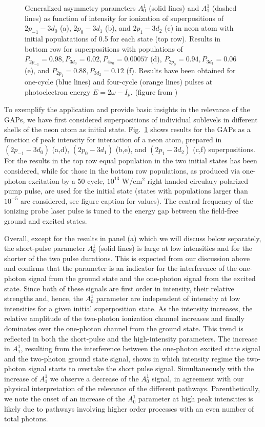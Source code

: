 \begin{figure}[!ht]
\caption{
Generalized asymmetry parameters $A_0^1$ (solid lines) and $A_1^1$ (dashed lines) as function of intensity for ionization of  superpositions of $2p_{-1}-3d_0$ (a), $2p_{0}-3d_1$ (b), and $2p_{1}-3d_2$ (c) in neon atom with initial populatations of 0.5 for each state (top row). Results in bottom row for superpositions with populations of $P_{2p_{-1}}=0.98,P_{3d_0}=0.02,P_{4s_0}=0.00057$ (d), $P_{2p_{0}}=0.94,P_{3d_1}=0.06$ (e), and $P_{2p_{1}}=0.88,P_{3d_2}=0.12$ (f). Results have been obtained for one-cycle (blue lines) and four-cycle (orange lines) pulses at photoelectron energy $E = 2\omega-I_p$. (figure from \cite{venzke2020_GAP})
} 
  \label{fig:Neon-1-photon}
\end{figure}

To exemplify the application and provide basic insights in the relevance of the GAPs, we have first considered superpositions of individual sublevels in different shells of the neon atom as initial state. Fig.~\ref{fig:Neon-1-photon} shows results for the GAPs as a function of peak intensity for interaction of a neon atom, prepared in $(2p_{-1}-3d_0)$ (a,d), $(2p_{0}-3d_1)$ (b,e),  and $(2p_{1}-3d_2)$ (c,f) superpositions. For the results in the top row equal population in the two initial states has been considered, while for those in the bottom row populations, as produced via one-photon excitation by a 50 cycle, $10^{13}$ W/cm$^2$ right handed circulary polarized pump pulse, are used for the initial state  
(states with populations larger than $10^{-5}$ are considered, see figure caption for values). The central frequency of the ionizing probe laser pulse is tuned to the energy gap between the field-free ground and excited states. 

Overall, except for the results in panel (a) which we will discuss below separately, the short-pulse parameter $A_0^1$ (solid lines) is large at low intensities and for the shorter of the two pulse durations. This is expected from our discussion above and confirms that the parameter is an indicator for the interference of the one-photon signal from the ground state and the one-photon signal from the excited state. Since both of these signals
are 
first order in intensity, their relative strengths and, hence, the $A_0^1$ parameter are independent of intensity at low intensities for a given initial superposition state. As the intensity increases, the relative amplitude of the two-photon ionization channel increases and finally dominates over the one-photon channel from the ground state. This trend is reflected in both the short-pulse and the high-intensity parameters. The increase in $A_1^1$, resulting from the interference between the one-photon excited state signal and the two-photon ground state signal, shows in which intensity regime the two-photon signal starts to overtake the short pulse signal. Simultaneously with the increase of $A_1^1$ we observe a decrease of the $A_0^1$ signal, in agreement with our physical interpretation of the relevance of the different pathways. Parenthetically, we note the onset of an increase of the $A_0^1$ parameter at high peak intensities is likely due to pathways involving higher order processes with an even number of total photons.

